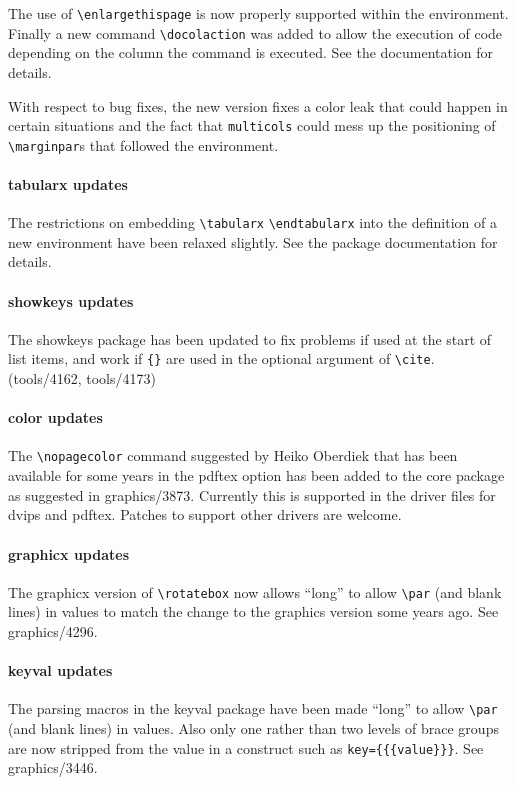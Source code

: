 \documentclass{ltnews}
\begin{document}
The use of \verb=\enlargethispage= is now properly supported
within the environment. Finally a new command \verb=\docolaction= was
added to allow the execution of code depending on the column the
command is executed. See the documentation for details.

With respect to bug fixes, the new version fixes a color leak that
could happen in certain situations and the fact that
\texttt{multicols} could mess up the positioning of
\verb=\marginpar=s that followed the environment.

\paragraph{\textsf{tabularx} updates}

The restrictions on embedding \verb|\tabularx| \verb|\endtabularx|
into the definition of a new environment have been relaxed
slightly. See the package documentation for details.

\paragraph{\textsf{showkeys} updates}

The \textsf{showkeys} package has been updated to fix problems if used
at the start of list items, and work if \verb|{}| are used in the
optional argument of \verb|\cite|. (tools/4162, tools/4173)


\paragraph{\textsf{color} updates}

The \verb|\nopagecolor| command suggested by Heiko Oberdiek that has
been available for some years in the \textsf{pdftex} option has been
added to the core package as suggested in graphics/3873. Currently
this is supported in the driver files for \textsf{dvips} and
\textsf{pdftex}.  Patches to support other drivers are welcome.

 \paragraph{\textsf{graphicx} updates}

The \textsf{graphicx} version of \verb|\rotatebox| now allows ``long''
to allow \verb|\par| (and blank lines) in values to match the change
to the \textsf{graphics} version some years ago. See graphics/4296.

\paragraph{\textsf{keyval} updates}

The parsing macros in the \textsf{keyval} package have been made
``long'' to allow \verb|\par| (and blank lines) in values. Also only
one rather than two levels of brace groups are now stripped from the
value in a construct such as \verb|key={{{value}}}|. See
graphics/3446.
\end{document}
